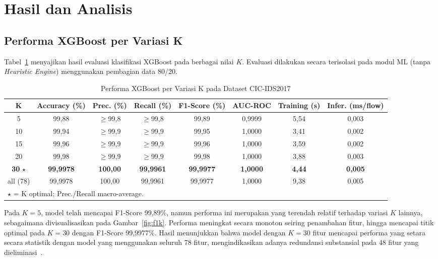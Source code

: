 \documentclass[conference,a4paper]{IEEEtran}
\begin{document}
\section{Hasil dan Analisis}
\label{sec:hasil}

\subsection{Performa XGBoost per Variasi K}

Tabel~\ref{tab:xgb_k} menyajikan hasil evaluasi klasifikasi XGBoost pada berbagai nilai $K$. Evaluasi dilakukan secara terisolasi pada modul ML (tanpa \textit{Heuristic Engine}) menggunakan pembagian data 80/20.

\begin{table}[t]
\caption{Performa XGBoost per Variasi K pada Dataset CIC-IDS2017}
\label{tab:xgb_k}
\centering
\footnotesize
\begin{tabular}{cccccccc}
\toprule
\textbf{K} & \textbf{Accuracy (\%)} & \textbf{Prec. (\%)} & \textbf{Recall (\%)} &
\textbf{F1-Score (\%)} & \textbf{AUC-ROC} & \textbf{Training (s)} & \textbf{Infer. (ms/flow)} \\
\midrule
5         & 99,88 & $\geq$99,8 & $\geq$99,8 & 99,89 & 0,9999 & 5,54 & 0,003 \\
10        & 99,94 & $\geq$99,9 & $\geq$99,9 & 99,95 & 1,0000 & 3,41 & 0,002 \\
15        & 99,96 & $\geq$99,9 & $\geq$99,9 & 99,96 & 1,0000 & 3,59 & 0,002 \\
20        & 99,98 & $\geq$99,9 & $\geq$99,9 & 99,98 & 1,0000 & 3,88 & 0,003 \\
\textbf{30} $\star$ & \textbf{99,9978} & \textbf{100,00} & \textbf{99,9961} & \textbf{99,9977} & \textbf{1,0000} & \textbf{4,44} & \textbf{0,005} \\
all (78)  & 99,9978 & 100,00 & 99,9961 & 99,9977 & 1,0000 & 9,38 & 0,005 \\
\bottomrule
\multicolumn{8}{l}{\small $\star$ = K optimal; Prec./Recall macro-average.}
\end{tabular}
\end{table}

Pada $K=5$, model telah mencapai F1-Score 99,89\%, namun performa ini merupakan yang terendah relatif terhadap variasi $K$ lainnya, sebagaimana divisualisasikan pada Gambar~\ref{fig:f1k}. Performa meningkat secara monoton seiring penambahan fitur, hingga mencapai titik optimal pada $K=30$ dengan F1-Score 99,9977\%. Hasil menunjukkan bahwa model dengan $K=30$ fitur mencapai performa yang setara secara statistik dengan model yang menggunakan seluruh 78 fitur, mengindikasikan adanya redundansi substansial pada 48 fitur yang dieliminasi~\cite{ref_kasongo2020,ref_alzahrani2021}.
\end{document}
